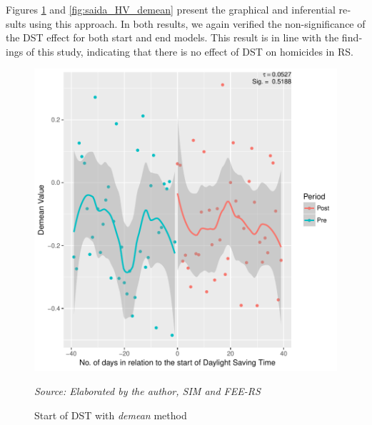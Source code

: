 \documentclass[12pt,openright,oneside,a4paper,english,french,spanish]{abntex2}
\numberwithin{table}{section} %
\numberwithin{figure}{section} %
\newcommand{\source}[1]{\textit{#1}}
\begin{document}
\begin{otherlanguage}{english}
Figures \ref{fig:entrada_HV_demean} and \ref{fig:saida_HV_demean} present the graphical and inferential results using this approach. In both results, we again verified the non-significance of the DST effect for both start and end models. This result is in line with the findings of this study, indicating that there is no effect of DST on homicides in RS.






\begin{figure}[H]
\begin{center}
\includegraphics{TESE_DE_DOUTORADO_RENAN_FINAL-plot_entrada_demean_pelo_GAM}
\end{center}
\caption{Start of DST with \textit{demean} method}
\source{Source: Elaborated by the author, SIM and FEE-RS}
\label{fig:entrada_HV_demean}
\end{figure}






\end{otherlanguage}
\end{document}
